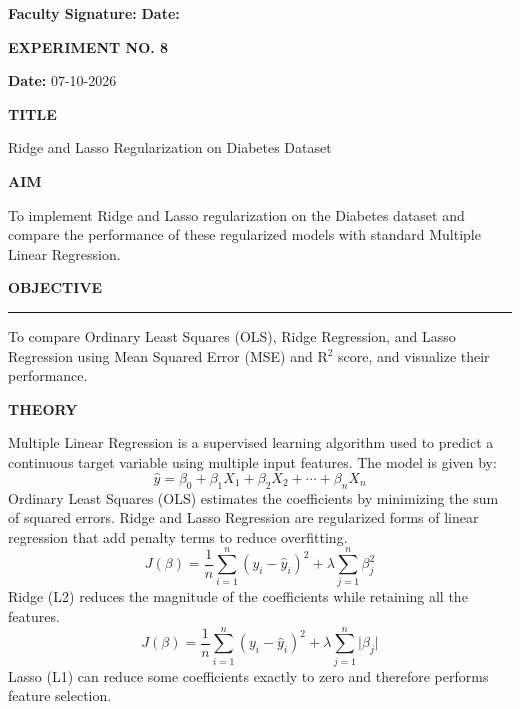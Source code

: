 \documentclass[11pt,twoside]{article}
\newcommand{\expheading}[1]{{\fontsize{14}{17}\selectfont\textbf{#1}\par}}
\newcommand{\fullrule}{\noindent\rule{\textwidth}{0.6pt}\par}
\newcommand{\tooddpage}{\clearpage\ifodd\value{page}\else\null\thispagestyle{empty}\newpage\fi}
\begin{document}
\noindent\textbf{Faculty Signature:} \underline{\hspace{3.6cm}} \hfill \textbf{Date:} \underline{\hspace{2.8cm}}\par

\tooddpage

{\setlength{\parskip}{1pt}\setlength{\abovedisplayskip}{2pt}\setlength{\belowdisplayskip}{2pt}
\begin{center}
\expheading{EXPERIMENT NO. 8}
\end{center}
\vspace{2pt}

\noindent\textbf{Date:} 07-10-2026\par
\vspace{6pt}

\expheading{TITLE}
\vspace{4pt}
\noindent Ridge and Lasso Regularization on Diabetes Dataset\par
\vspace{4pt}

\expheading{AIM}
\vspace{4pt}
\noindent To implement Ridge and Lasso regularization on the Diabetes dataset and compare the performance of these regularized models with standard Multiple Linear Regression. \par
\vspace{4pt}

\expheading{OBJECTIVE}
\vspace{2pt}
\fullrule
\vspace{4pt}
\noindent To compare Ordinary Least Squares (OLS), Ridge Regression, and Lasso Regression using Mean Squared Error (MSE) and R$^2$ score, and visualize their performance. \par
\vspace{4pt}

\expheading{THEORY}
\vspace{4pt}
Multiple Linear Regression is a supervised learning algorithm used to predict a continuous target variable using multiple input features. The model is given by:
\[\hat{y}=\beta_0+\beta_1X_1+\beta_2X_2+\cdots+\beta_nX_n\]
Ordinary Least Squares (OLS) estimates the coefficients by minimizing the sum of squared errors. Ridge and Lasso Regression are regularized forms of linear regression that add penalty terms to reduce overfitting.
\[J(\beta)=\frac{1}{n}\sum_{i=1}^{n}(y_i-\hat{y}_i)^2+\lambda\sum_{j=1}^{n}\beta_j^2\]
Ridge (L2) reduces the magnitude of the coefficients while retaining all the features.
\[J(\beta)=\frac{1}{n}\sum_{i=1}^{n}(y_i-\hat{y}_i)^2+\lambda\sum_{j=1}^{n}\lvert\beta_j\rvert\]
Lasso (L1) can reduce some coefficients exactly to zero and therefore performs feature selection.
\vspace{4pt}

}
\end{document}
